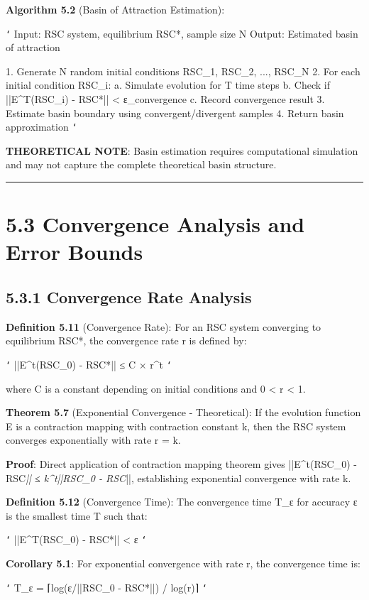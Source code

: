 \textbf{Algorithm 5.2} (Basin of Attraction Estimation):

\texttt{`}
Input: RSC system, equilibrium RSC*, sample size N
Output: Estimated basin of attraction

1. Generate N random initial conditions {RSC_1, RSC_2, ..., RSC_N}
2. For each initial condition RSC_i:
   a. Simulate evolution for T time steps
   b. Check if ||E^T(RSC_i) - RSC*|| < ε_convergence
   c. Record convergence result
3. Estimate basin boundary using convergent/divergent samples
4. Return basin approximation
\texttt{`}

\textbf{THEORETICAL NOTE}: Basin estimation requires computational simulation and may not capture the complete theoretical basin structure.

\hrule

\section{5.3 Convergence Analysis and Error Bounds}

\subsection{5.3.1 Convergence Rate Analysis}

\textbf{Definition 5.11} (Convergence Rate): For an RSC system converging to equilibrium RSC*, the convergence rate r is defined by:

\texttt{`}
||E^t(RSC_0) - RSC*|| ≤ C × r^t
\texttt{`}

where C is a constant depending on initial conditions and 0 < r < 1.

\textbf{Theorem 5.7} (Exponential Convergence - Theoretical): If the evolution function E is a contraction mapping with contraction constant k, then the RSC system converges exponentially with rate r = k.

\textbf{Proof}: Direct application of contraction mapping theorem gives ||E^t(RSC_0) - RSC\textit{|| ≤ k^t||RSC_0 - RSC}||, establishing exponential convergence with rate k.

\textbf{Definition 5.12} (Convergence Time): The convergence time T_ε for accuracy ε is the smallest time T such that:

\texttt{`}
||E^T(RSC_0) - RSC*|| < ε
\texttt{`}

\textbf{Corollary 5.1}: For exponential convergence with rate r, the convergence time is:

\texttt{`}
T_ε = ⌈log(ε/||RSC_0 - RSC*||) / log(r)⌉
\texttt{`}

